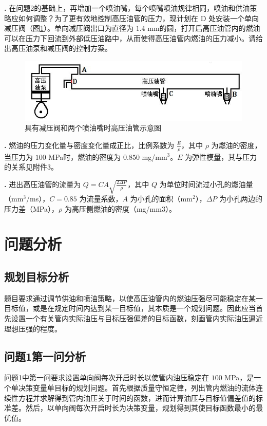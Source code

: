 \documentclass[12pt,a4paper]{article}
\begin{document}
\textbf{.} 在问题2的基础上，再增加一个喷油嘴，每个喷嘴喷油规律相同，喷油和供油策略应如何调整？为了更有效地控制高压油管的压力，现计划在 D 处安装一个单向减压阀（图\ref{juyoujianyafahelianggepenyouzuishigaoyayouguanshiyitu}）。单向减压阀出口为直径为 $1.4$ mm的圆，打开后高压油管内的燃油可以在压力下回流到外部低压油路中，从而使得高压油管内燃油的压力减小。请给出高压油泵和减压阀的控制方案。
\begin{figure}[h]
\centering
\includegraphics[scale=1]{juyoujianyafahelianggepenyouzuishigaoyayouguanshiyitu.jpg}
\caption{具有减压阀和两个喷油嘴时高压油管示意图}\label{juyoujianyafahelianggepenyouzuishigaoyayouguanshiyitu}
\end{figure}

\textbf{.} 燃油的压力变化量与密度变化量成正比，比例系数为 $\frac{E}{\rho}$，其中 $\rho$ 为燃油的密度，当压力为 $100$ MPa时，燃油的密度为 $0.850$ mg/mm$^{3}$。$E$ 为弹性模量，其与压力的关系见附件3。

\textbf{.} 进出高压油管的流量为 $Q=CA\sqrt{\frac{2\Delta P}{\rho}}$，其中 $Q$ 为单位时间流过小孔的燃油量（mm$^3$/ms），$C=0.85$ 为流量系数，$A$ 为小孔的面积（mm$^2$），$\Delta P$ 为小孔两边的压力差（MPa），$\rho$ 为高压侧燃油的密度（mg/mm3）。

\section{问题分析}

\subsection{规划目标分析}
题目要求通过调节供油和喷油策略，以使高压油管内的燃油压强尽可能稳定在某一目标值，或是在规定时间内达到某一目标值，其本质是一个规划问题。因此应当首先设置一个有关管内实际油压与目标压强偏差的目标函数，刻画管内实际油压逼近理想压强的程度。

\subsection{问题1第一问分析}
问题1中第一问要求设置单向阀每次开启时长以使管内油压稳定在 $100$ MPa，是一个单决策变量单目标的规划问题。首先根据质量守恒定律，列出管内燃油的流体连续性方程并求解得到管内油压关于时间的函数，进而计算油压与目标值偏差值的标准差。然后，以单向阀每次开启时长为决策变量，规划得到其使目标函数最小的最优值。
\end{document}
